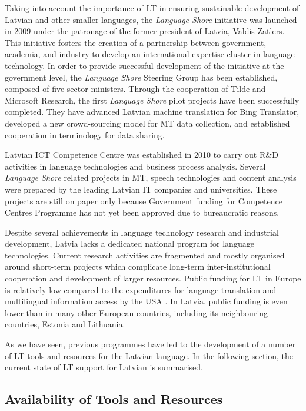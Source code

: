 \begin{multicols}{2}
Taking into account the importance of LT in ensuring sustainable development of Latvian and other smaller languages, the \textit{Language Shore} initiative was launched in 2009 under the patronage of the former president of Latvia, Valdis Zatlers.
This initiative fosters the creation of a partnership between government, academia, and industry to develop an international expertise cluster in language technology.
In order to provide successful development of the initiative at the government level, the \textit{Language Shore} Steering Group has been established, composed of five sector ministers.
Through the cooperation of Tilde and Microsoft Research, the first \textit{Language Shore} pilot projects have been successfully completed.
They have advanced Latvian machine translation for Bing Translator, developed a new crowd-sourcing model for MT data collection, and established cooperation in terminology for data sharing. 

Latvian ICT Competence Centre was established in 2010 to carry out R\&D activities in language technologies and business process analysis.
Several \textit{Language Shore} related projects in MT, speech technologies and content analysis were prepared by the leading Latvian IT companies and universities.
These projects are still on paper only because Government funding for Competence Centres Programme has not yet been approved due to bureaucratic reasons.

Despite several achievements in language technology research and industrial development, Latvia lacks a dedicated national program for language technologies.
Current research activities are fragmented and mostly organised around short-term projects which complicate long-term inter-institutional cooperation and development of larger resources.
Public funding for LT in Europe is relatively low compared to the expenditures for language translation and multilingual information access by the USA \cite{Meta46}.
In Latvia, public funding is even lower than in many other European countries, including its neighbouring countries, Estonia and Lithuania.

As we have seen, previous programmes have led to the development of a number of LT tools and resources for the Latvian language.
In the following section, the current state of LT support for Latvian is summarised.  

\subsection{Availability of Tools and Resources}


\end{multicols}
